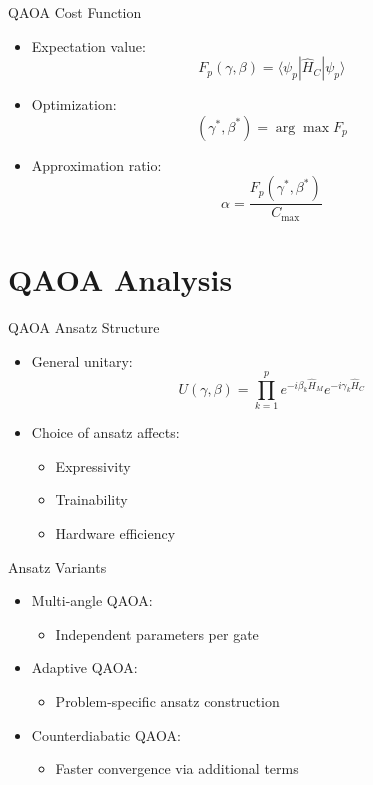 \documentclass{beamer}
\begin{document}

\begin{frame}{QAOA Cost Function}
\begin{itemize}
\item Expectation value:
\[
F_p(\gamma,\beta) =
\langle \psi_p | \hat{H}_C | \psi_p \rangle
\]
\item Optimization:
\[
(\gamma^*,\beta^*) = \arg\max F_p
\]
\item Approximation ratio:
\[
\alpha = \frac{F_p(\gamma^*,\beta^*)}{C_{\max}}
\]
\end{itemize}
\end{frame}

\section{QAOA Analysis}

\begin{frame}{QAOA Ansatz Structure}
\begin{itemize}
\item General unitary:
\[
U(\gamma,\beta) =
\prod_{k=1}^p e^{-i\beta_k \hat{H}_M} e^{-i\gamma_k \hat{H}_C}
\]
\item Choice of ansatz affects:
\begin{itemize}
\item Expressivity
\item Trainability
\item Hardware efficiency
\end{itemize}
\end{itemize}
\end{frame}


\begin{frame}{Ansatz Variants}
\begin{itemize}
\item Multi-angle QAOA:
\begin{itemize}
\item Independent parameters per gate
\end{itemize}
\item Adaptive QAOA:
\begin{itemize}
\item Problem-specific ansatz construction
\end{itemize}
\item Counterdiabatic QAOA:
\begin{itemize}
\item Faster convergence via additional terms
\end{itemize}
\end{itemize}
\end{frame}
\end{document}
